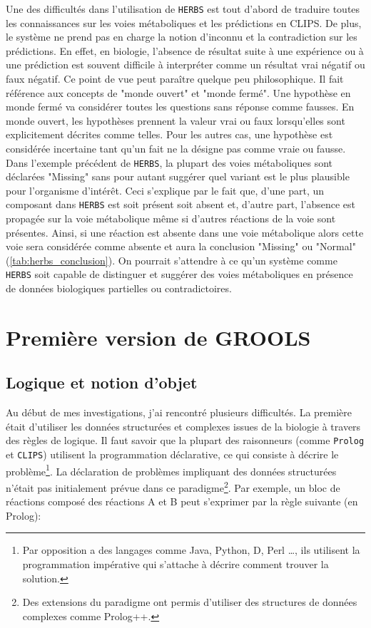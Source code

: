 \begin{refsegment}
Une des difficultés dans l'utilisation de \texttt{\gls{HERBS}} est tout d'abord de traduire toutes les connaissances sur les voies métaboliques et les prédictions en CLIPS. De plus, le système ne prend pas en charge la notion d'inconnu et la contradiction sur les prédictions. En effet, en biologie, l'absence de résultat suite à une expérience ou à une prédiction est souvent difficile à interpréter comme un résultat vrai négatif ou faux négatif. Ce point de vue peut paraître quelque peu philosophique. Il fait référence aux concepts de "monde ouvert" et "monde fermé". Une hypothèse en monde fermé va considérer toutes les questions sans réponse comme fausses. En monde ouvert, les hypothèses prennent la valeur vrai ou faux lorsqu'elles sont explicitement décrites comme telles. Pour les autres cas, une hypothèse est considérée incertaine tant qu'un fait ne la désigne pas comme vraie ou fausse. Dans l'exemple précédent de \texttt{\gls{HERBS}}, la plupart des voies métaboliques sont déclarées "Missing" sans pour autant suggérer quel variant est le plus plausible pour l'organisme d'intérêt. Ceci s'explique par le fait que, d'une part, un composant dans \texttt{\gls{HERBS}} est soit présent soit absent et, d'autre part, l'absence est propagée sur la voie métabolique même si d'autres réactions de la voie sont présentes. Ainsi, si une réaction est absente dans une voie métabolique alors cette voie sera considérée comme absente et aura la conclusion "Missing" ou "Normal" (\cref{tab:herbs_conclusion}). On pourrait s'attendre à ce qu'un système comme \texttt{\gls{HERBS}} soit capable de distinguer et suggérer des voies métaboliques en présence de données biologiques partielles ou contradictoires. 

\section{Première version de GROOLS}

\subsection{Logique et notion d'objet}

Au début de mes investigations, j'ai rencontré plusieurs difficultés. La première était d'utiliser les données structurées et complexes issues de la biologie à travers des règles de logique. Il faut savoir que la plupart des raisonneurs (comme \texttt{Prolog} et \texttt{CLIPS}) utilisent la programmation déclarative, ce qui consiste à décrire le problème\footnote{Par opposition a des langages comme Java, Python, D, Perl \ldots, ils utilisent la programmation impérative qui s'attache à décrire comment trouver la solution.}. La déclaration de problèmes impliquant des données structurées n'était pas initialement prévue dans ce paradigme\footnote{Des extensions du paradigme ont permis d'utiliser des structures de données complexes comme Prolog++.}. Par exemple, un bloc de réactions composé  des réactions A et B peut s'exprimer par la règle suivante (en Prolog):


\end{refsegment}
